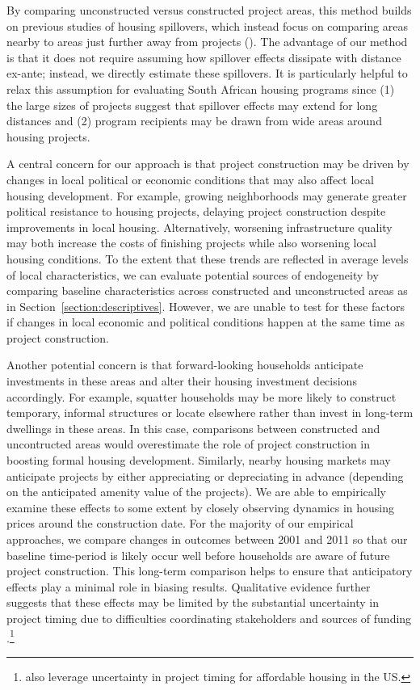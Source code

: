 \documentclass[12pt]{article}
\begin{document}
By comparing unconstructed versus constructed project areas, this method builds on previous studies of housing spillovers, which instead focus on comparing areas nearby to areas just further away from projects (\cite{diamond2016wants}).  The advantage of our method is that it does not require assuming how spillover effects dissipate with distance ex-ante; instead, we directly estimate these spillovers.  It is particularly helpful to relax this assumption for evaluating South African housing programs since (1) the large sizes of projects suggest that spillover effects may extend for long distances and (2) program recipients may be drawn from wide areas around housing projects.  

A central concern for our approach is that project construction may be driven by changes in local political or economic conditions that may also affect local housing development.  For example, growing neighborhoods may generate greater political resistance to housing projects, delaying project construction despite improvements in local housing.  Alternatively, worsening infrastructure quality may both increase the costs of finishing projects while also worsening local housing conditions.  To the extent that these trends are reflected in average levels of local characteristics, we can evaluate potential sources of endogeneity by comparing baseline characteristics across constructed and unconstructed areas as in Section~\ref{section:descriptives}.  However, we are unable to test for these factors if changes in local economic and political conditions happen at the same time as project construction.

Another potential concern is that forward-looking households anticipate investments in these areas and alter their housing investment decisions accordingly.  For example, squatter households may be more likely to construct temporary, informal structures or locate elsewhere rather than invest in long-term dwellings in these areas.  In this case, comparisons between constructed and uncontructed areas would overestimate the role of project construction in boosting formal housing development.  Similarly, nearby housing markets may anticipate projects by either appreciating or depreciating in advance (depending on the anticipated amenity value of the projects).  We are able to empirically examine these effects to some extent by closely observing dynamics in housing prices around the construction date.  For the majority of our empirical approaches, we compare changes in outcomes between 2001 and 2011 so that our baseline time-period is likely occur well before households are aware of future project construction.  This long-term comparison helps to ensure that anticipatory effects play a minimal role in biasing results.  Qualitative evidence further suggests that these effects may be limited by the substantial uncertainty in project timing due to difficulties coordinating stakeholders and sources of funding \citep{serihistory}.\footnote{\cite{diamond2016wants} also leverage uncertainty in project timing for affordable housing in the US.}
\end{document}

